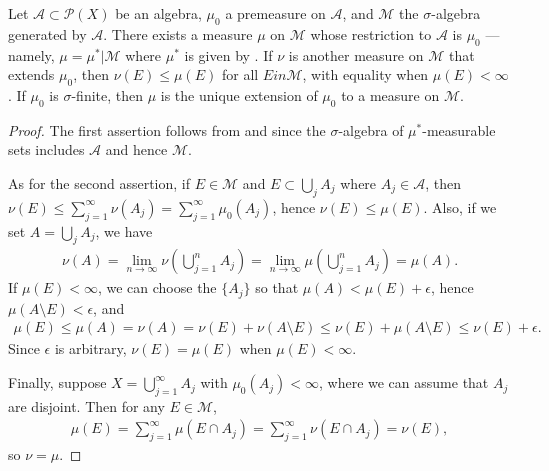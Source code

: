 \begin{theorem}
    Let $\mathcal{A} \subset \mathcal{P}(X)$ be an algebra, $\mu_0$ a premeasure on $\mathcal{A}$, and $\mathcal{M}$ the $\sigma$-algebra generated by $\mathcal{A}$.
    There exists a measure $\mu$ on $\mathcal{M}$ whose restriction to $\mathcal{A}$ is $\mu_0$ --- namely, $\mu = \mu^* | \mathcal{M}$ where $\mu^*$ is given by .
    If $\nu$ is another measure on $\mathcal{M}$ that extends $\mu_0$, then $\nu(E) \le \mu(E)$ for all $E in \mathcal{M}$, with equality when $\mu(E) < \infty$.
    If $\mu_0$ is $\sigma$-finite, then $\mu$ is the unique extension of $\mu_0$ to a measure on $\mathcal{M}$.
\end{theorem}

\begin{proof}
    The first assertion follows from  and  since the $\sigma$-algebra of $\mu^*$-measurable sets includes $\mathcal{A}$ and hence $\mathcal{M}$.

    As for the second assertion, if $E \in \mathcal{M}$ and $E \subset \bigcup_{j} A_j$ where $A_j \in \mathcal{A}$, then $\nu(E) \le \sum_{j=1}^{\infty} \nu(A_j) = \sum_{j=1}^{\infty} \mu_0(A_j)$, hence $\nu(E) \le \mu(E)$.
    Also, if we set $A = \bigcup_{j} A_j$, we have
    \begin{align}
        \nu(A) = \lim_{n \to \infty} \nu\left( \bigcup_{j=1}^{n} A_j \right) = \lim_{n \to \infty} \mu\left( \bigcup_{j=1}^{n} A_j \right) = \mu(A).
    \end{align}
    If $\mu(E) < \infty$, we can choose the $\{A_j\}$ so that $\mu(A) < \mu(E) + \epsilon$, hence $\mu(A \setminus E) < \epsilon$, and 
    \begin{align}
        \mu(E) \le \mu(A) = \nu(A) = \nu(E) + \nu(A \setminus E) \le \nu(E) + \mu(A \setminus E) \le \nu(E) + \epsilon.
    \end{align}
    Since $\epsilon$ is arbitrary, $\nu(E) = \mu(E)$ when $\mu(E) < \infty$.

    Finally, suppose $X = \bigcup_{j=1}^{\infty} A_j$ with $\mu_0(A_j) < \infty$, where we can assume that $A_j$ are disjoint.
    Then for any $E \in \mathcal{M}$,
    \begin{align}
        \mu(E) = \sum_{j=1}^{\infty} \mu(E \cap A_j) = \sum_{j=1}^{\infty} \nu(E \cap A_j) = \nu(E),
    \end{align}
    so $\nu = \mu$.
\end{proof}

